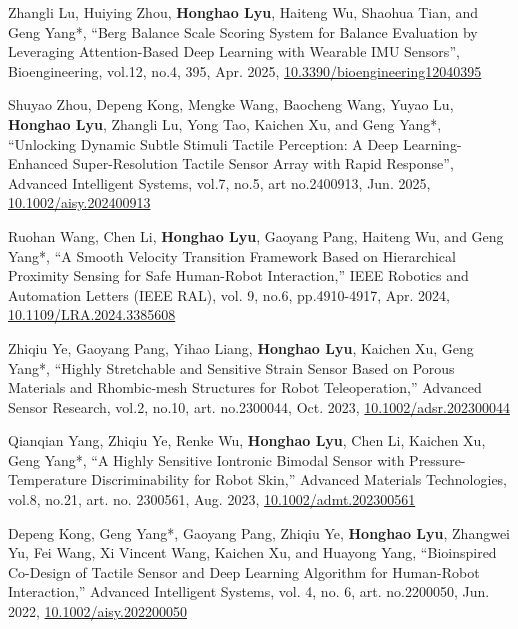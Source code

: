 \begin{enumerate}[align=left, widest={[\textbf{S.1}]}, itemindent=0em, label={\textbf{[\arabic*]}]
    \item[\textbf{[J.9]}] Zhangli Lu, Huiying Zhou, \textbf{Honghao Lyu}, Haiteng Wu, Shaohua Tian, and Geng Yang*, ``Berg Balance Scale Scoring System for Balance Evaluation by Leveraging Attention-Based Deep Learning with Wearable IMU Sensors'', Bioengineering, vol.12, no.4, 395, Apr. 2025, \href{http://doi.org/10.3390/bioengineering12040395}{10.3390/bioengineering12040395}
    \item[\textbf{[J.8]}] Shuyao Zhou, Depeng Kong, Mengke Wang, Baocheng Wang, Yuyao Lu, \textbf{Honghao Lyu}, Zhangli Lu, Yong Tao, Kaichen Xu, and Geng Yang*, ``Unlocking Dynamic Subtle Stimuli Tactile Perception: A Deep Learning-Enhanced Super-Resolution Tactile Sensor Array with Rapid Response'', Advanced Intelligent Systems, vol.7, no.5, art no.2400913, Jun. 2025, \href{http://doi.org/10.1002/aisy.202400913}{10.1002/aisy.202400913}
    \item[\textbf{[J.7]}] Ruohan Wang, Chen Li, \textbf{Honghao Lyu}, Gaoyang Pang, Haiteng Wu, and Geng Yang*, ``A Smooth Velocity Transition Framework Based on Hierarchical Proximity Sensing for Safe Human-Robot Interaction,'' IEEE Robotics and Automation Letters (IEEE RAL), vol. 9, no.6, pp.4910-4917, Apr. 2024, \href{https://doi.org/10.1109/LRA.2024.3385608}{10.1109/LRA.2024.3385608}
    \item[\textbf{[J.6]}] Zhiqiu Ye, Gaoyang Pang, Yihao Liang, \textbf{Honghao Lyu}, Kaichen Xu, Geng Yang*, ``Highly Stretchable and Sensitive Strain Sensor Based on Porous Materials and Rhombic-mesh Structures for Robot Teleoperation,'' Advanced Sensor Research, vol.2, no.10, art. no.2300044, Oct. 2023, \href{https://doi.org/10.1002/adsr.202300044}{10.1002/adsr.202300044}
    \item[\textbf{[J.5]}] Qianqian Yang, Zhiqiu Ye, Renke Wu, \textbf{Honghao Lyu}, Chen Li, Kaichen Xu, Geng Yang*, ``A Highly Sensitive Iontronic Bimodal Sensor with Pressure-Temperature Discriminability for Robot Skin,'' Advanced Materials Technologies, vol.8, no.21, art. no. 2300561, Aug. 2023, \href{https://doi.org/10.1002/admt.202300561}{10.1002/admt.202300561}
    \item[\textbf{[J.4]}] Depeng Kong, Geng Yang*, Gaoyang Pang, Zhiqiu Ye, \textbf{Honghao Lyu}, Zhangwei Yu, Fei Wang, Xi Vincent Wang, Kaichen Xu, and Huayong Yang, ``Bioinspired Co-Design of Tactile Sensor and Deep Learning Algorithm for Human-Robot Interaction,'' Advanced Intelligent Systems, vol. 4, no. 6, art. no.2200050, Jun. 2022, \href{https://doi.org/10.1002/aisy.202200050}{10.1002/aisy.202200050}

\end{enumerate}
